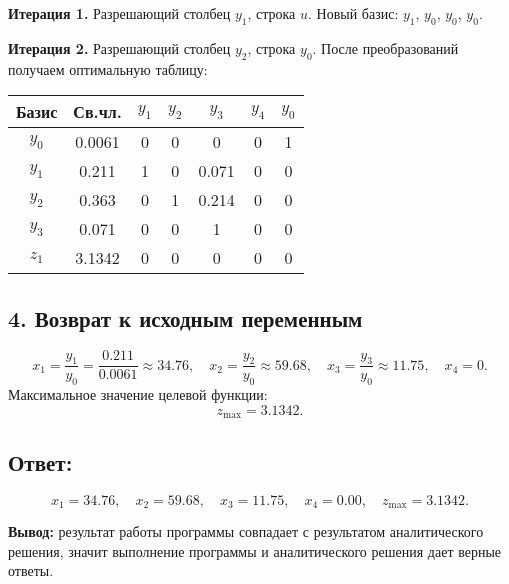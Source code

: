\documentclass{report}
\begin{document}
\vspace{0.5cm}
\textbf{Итерация 1.} Разрешающий столбец $y_1$, строка $u$. Новый базис: $y_1$, $y_0$, $y_0$, $y_0$.

\vspace{0.5cm}
\textbf{Итерация 2.} Разрешающий столбец $y_2$, строка $y_0$. После преобразований получаем оптимальную таблицу:

\begin{center}
	\begin{tabular}{|c|c|ccccc|}
		\hline
		Базис & Св.чл. & $y_1$ & $y_2$ & $y_3$ & $y_4$ & $y_0$ \\ \hline
		$y_0$ & 0.0061 & 0 & 0 & 0 & 0 & 1 \\
		$y_1$ & 0.211 & 1 & 0 & 0.071 & 0 & 0 \\
		$y_2$ & 0.363 & 0 & 1 & 0.214 & 0 & 0 \\
		$y_3$ & 0.071 & 0 & 0 & 1 & 0 & 0 \\ \hline
		$z_1$ & 3.1342 & 0 & 0 & 0 & 0 & 0 \\ \hline
	\end{tabular}
\end{center}

\subsection*{4. Возврат к исходным переменным}
\[
x_1 = \frac{y_1}{y_0} = \frac{0.211}{0.0061} \approx 34.76, \quad 
x_2 = \frac{y_2}{y_0} \approx 59.68, \quad 
x_3 = \frac{y_3}{y_0} \approx 11.75, \quad 
x_4 = 0.
\]
Максимальное значение целевой функции:
\[
z_{\text{max}} = 3.1342.
\]

\subsection*{Ответ:}
\[
x_1 = 34.76,\quad x_2 = 59.68,\quad x_3 = 11.75,\quad x_4 = 0.00,\quad z_{\text{max}} = 3.1342.
\]

	\textbf{Вывод: }результат работы программы совпадает с результатом аналитического решения,  значит выполнение программы и аналитического решения дает верные ответы.
\end{document}
